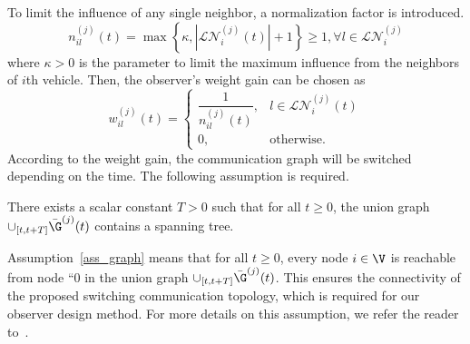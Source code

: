 To limit the influence of any single neighbor, a normalization factor is introduced.
\begin{equation}\label{new_setneibor}
n_{il}^{(j)}(t)=\max \left\{\kappa,\left|\mathcal{LN}_i^{(j)}(t)\right|+1\right\} \geq 1, \forall l\in \mathcal{LN}_i^{(j)}
\end{equation}
where $\kappa >0$ is the parameter to limit the maximum influence from the neighbors of $i$th vehicle. 
Then, the observer's weight gain can be chosen as
\begin{equation}\label{design_gain}
    w_{il}^{(j)}(t) = \begin{cases}
        \dfrac{1}{n_{il}^{(j)}(t)}, & l \in \mathcal{LN}_i^{(j)}(t)\\
        0 ,& \text{otherwise}.
    \end{cases}
\end{equation}
%
According to the weight gain, the communication graph will be switched depending on the time. The following assumption is required.
\begin{assumption}%
\label{ass_graph}
There exists a scalar constant $T > 0$ such that for all $t\geq 0$, the union graph $\cup _{[t, t+ T]}\bar{\G}^{(j)}(t)$ contains a spanning tree.
\end{assumption}
Assumption~\ref{ass_graph} means that for all $t\geq 0$, every node $i \in\V$ is reachable from node ``0 in the union graph $\cup _{[t, t+ T]}\bar{\G}^{(j)}(t)$. This ensures the connectivity of the proposed switching communication topology, which is required for our observer design method. For more details on this assumption, we refer the reader to~\cite{hao2024eventtriggered}.




